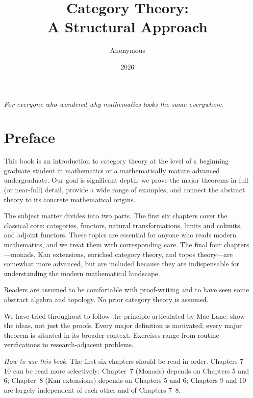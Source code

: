 \documentclass{amsbook}
\title{Category Theory:\\A Structural Approach}
\author{Anonymous}
\date{2026}
\begin{document}
\frontmatter

\maketitle

\cleardoublepage
\thispagestyle{empty}
\vspace*{3in}
\begin{center}
  \itshape
  For everyone who wondered why mathematics looks the same everywhere.
\end{center}

\chapter*{Preface}

This book is an introduction to category theory at the level of a beginning graduate student in mathematics or a mathematically mature advanced undergraduate. Our goal is significant depth: we prove the major theorems in full (or near-full) detail, provide a wide range of examples, and connect the abstract theory to its concrete mathematical origins.

The subject matter divides into two parts. The first six chapters cover the classical core: categories, functors, natural transformations, limits and colimits, and adjoint functors. These topics are essential for anyone who reads modern mathematics, and we treat them with corresponding care. The final four chapters—monads, Kan extensions, enriched category theory, and topos theory—are somewhat more advanced, but are included because they are indispensable for understanding the modern mathematical landscape.

Readers are assumed to be comfortable with proof-writing and to have seen some abstract algebra and topology. No prior category theory is assumed.

We have tried throughout to follow the principle articulated by Mac Lane: show the ideas, not just the proofs. Every major definition is motivated; every major theorem is situated in its broader context. Exercises range from routine verifications to research-adjacent problems.

\bigskip
\noindent\textit{How to use this book.} The first six chapters should be read in order. Chapters 7–10 can be read more selectively: Chapter~7 (Monads) depends on Chapters 5 and 6; Chapter~8 (Kan extensions) depends on Chapters 5 and 6; Chapters 9 and 10 are largely independent of each other and of Chapters 7–8.
\end{document}

